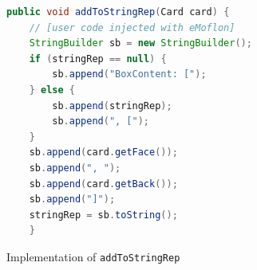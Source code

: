 \newpage

\vspace*{3cm}

\begin{figure}[h!]
\centering
\begin{lstlisting}[language=Java, keywordstyle={\bfseries\color{purple}}, backgroundcolor=\color{white}]
public void addToStringRep(Card card) {
	// [user code injected with eMoflon]
	StringBuilder sb = new StringBuilder();
	if (stringRep == null) {
		sb.append("BoxContent: [");
	} else {
		sb.append(stringRep);
		sb.append(", [");
	}
	sb.append(card.getFace());
	sb.append(", ");
	sb.append(card.getBack());
	sb.append("]");
	stringRep = sb.toString();
	}
        \end{lstlisting}
        \caption{Implementation of \texttt{addToStringRep}}
        \label{code:addToStringRep_inject_file}
    \end{figure}
    \FloatBarrier





